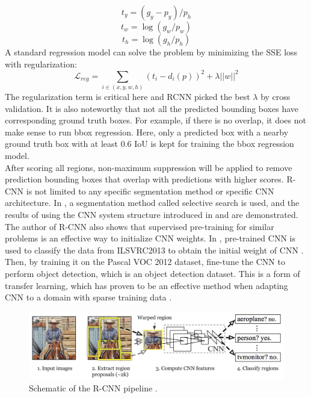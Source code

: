 \begin{equation}
	t_y=(g_y-p_y )/p_h
\end{equation}
\begin{equation}
	t_w=\log{(g_w/p_w)} 
\end{equation}
\begin{equation}
	t_h=\log{(g_h/p_h)} 
\end{equation}
A standard regression model can solve the problem by minimizing the SSE loss with regularization:
\begin{equation}
	\mathcal{L}_{reg} = \sum_{i \in (x,y,w,h)}(t_i-d_i(p))^2 + \lambda||w||^2
\end{equation}
The regularization term is critical here and RCNN picked the best \(\lambda\) by cross validation. It is also noteworthy that not all the predicted bounding boxes have corresponding ground truth boxes. For example, if there is no overlap, it does not make sense to run bbox regression. Here, only a predicted box with a nearby ground truth box with at least 0.6 IoU is kept for training the bbox regression model.
\\After scoring all regions, non-maximum suppression will be applied to remove prediction bounding boxes that overlap with predictions with higher scores. R-CNN is not limited to any specific segmentation method or specific CNN architecture. In \cite{DBLP:journals/corr/GirshickDDM13}, a segmentation method called selective search \cite{6126456} is used, and the results of using the CNN system structure introduced in \cite{10.1145/3065386} and \cite{Simonyan2015VeryDC} are demonstrated.
\\The author of R-CNN also shows that supervised pre-training for similar problems is an effective way to initialize CNN weights. In \cite{DBLP:journals/corr/GirshickDDM13}, pre-trained CNN is used to classify the data from ILSVRC2013 to obtain the initial weight of CNN \cite{DBLP:journals/corr/RussakovskyDSKSMHKKBBF14}. Then, by training it on the Pascal VOC 2012 dataset, fine-tune the CNN to perform object detection, which is an object detection dataset. This is a form of transfer learning, which has proven to be an effective method when adapting CNN to a domain with sparse training data \cite{DBLP:journals/corr/abs-1808-01974}.
\begin{figure}[ht!]
	\centerline{\includegraphics[width=1\textwidth]{Figs/RCNN.png}}
	\caption{Schematic of the R-CNN pipeline \cite{DBLP:journals/corr/GirshickDDM13}.}
	\label{fig:rcnnSche}
\end{figure}
